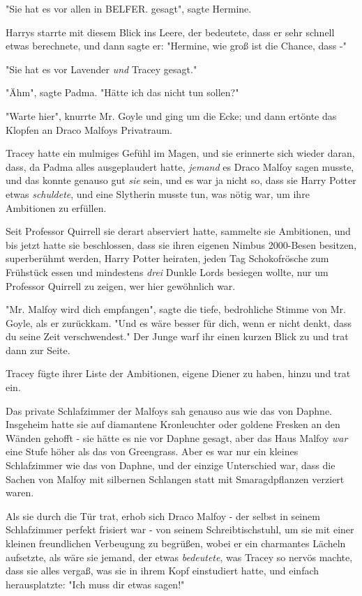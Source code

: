 {"Sie hat es vor allen in BELFER. gesagt", sagte Hermine.

Harrys starrte mit diesem Blick ins Leere, der bedeutete, dass er sehr schnell etwas berechnete, und dann sagte er: "Hermine, wie groß ist die Chance, dass -"

"Sie hat es vor Lavender \emph{und} Tracey gesagt."

"Ähm", sagte Padma. "Hätte ich das nicht tun sollen?"

"Warte hier", knurrte Mr. Goyle und ging um die Ecke; und dann ertönte das Klopfen an Draco Malfoys Privatraum.

Tracey hatte ein mulmiges Gefühl im Magen, und sie erinnerte sich wieder daran, dass, da Padma alles ausgeplaudert hatte, \emph{jemand} es Draco Malfoy sagen musste, und das konnte genauso gut \emph{sie} sein, und es war ja nicht so, dass sie Harry Potter etwas \emph{schuldete}, und eine Slytherin musste tun, was nötig war, um ihre Ambitionen zu erfüllen.

Seit Professor Quirrell sie derart abserviert hatte, sammelte sie Ambitionen, und bis jetzt hatte sie beschlossen, dass sie ihren eigenen Nimbus 2000-Besen besitzen, superberühmt werden, Harry Potter heiraten, jeden Tag Schokofrösche zum Frühstück essen und mindestens \emph{drei} Dunkle Lords besiegen wollte, nur um Professor Quirrell zu zeigen, wer hier gewöhnlich war.

"Mr. Malfoy wird dich empfangen", sagte die tiefe, bedrohliche Stimme von Mr. Goyle, als er zurückkam. "Und es wäre besser für dich, wenn er nicht denkt, dass du seine Zeit verschwendest." Der Junge warf ihr einen kurzen Blick zu und trat dann zur Seite.

Tracey fügte ihrer Liste der Ambitionen, eigene Diener zu haben, hinzu und trat ein.

Das private Schlafzimmer der Malfoys sah genauso aus wie das von Daphne. Insgeheim hatte sie auf diamantene Kronleuchter oder goldene Fresken an den Wänden gehofft - sie hätte es nie vor Daphne gesagt, aber das Haus Malfoy \emph{war} eine Stufe höher als das von Greengrass. Aber es war nur ein kleines Schlafzimmer wie das von Daphne, und der einzige Unterschied war, dass die Sachen von Malfoy mit silbernen Schlangen statt mit Smaragdpflanzen verziert waren.

Als sie durch die Tür trat, erhob sich Draco Malfoy - der selbst in seinem Schlafzimmer perfekt frisiert war - von seinem Schreibtischstuhl, um sie mit einer kleinen freundlichen Verbeugung zu begrüßen, wobei er ein charmantes Lächeln aufsetzte, als wäre sie jemand, der etwas \emph{bedeutete}, was Tracey so nervös machte, dass sie alles vergaß, was sie in ihrem Kopf einstudiert hatte, und einfach herausplatzte: "Ich muss dir etwas sagen!"

}
